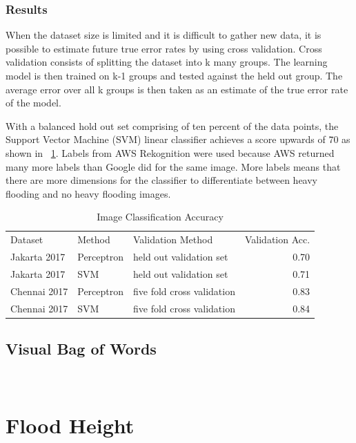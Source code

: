 \subsubsection{Results}
When the dataset size is limited and it is difficult to gather new data, 
it is possible to estimate future true error rates by using
cross validation. Cross validation consists of splitting the dataset into
k many groups. The learning model is then trained on k-1 groups and tested 
against the held out group. The average error over all k groups is then 
taken as an estimate of the true error rate of the model.

With a balanced hold out set comprising of ten percent of the
data points, the Support Vector Machine (SVM) linear classifier achieves a score
upwards of \.70 as shown in \tablename{}~\ref{chap4:imageSvmPerceptron}.
Labels from AWS Rekognition were used because AWS returned many more labels than 
Google did for the same image. More labels means that there are more dimensions
for the classifier to differentiate between heavy flooding and no heavy flooding
images.

\begin{table}[htbp]
\caption{Image Classification Accuracy}
\label{chap4:imageSvmPerceptron}
\begin{tabular}{lllr}
\toprule
      Dataset &      Method &           Validation Method &  Validation Acc. \\
 Jakarta 2017 &  Perceptron &     held out validation set &             0.70 \\
\midrule
 Jakarta 2017 &         SVM &     held out validation set &             0.71 \\
 Chennai 2017 &  Perceptron &  five fold cross validation &             0.83 \\
 Chennai 2017 &         SVM &  five fold cross validation &             0.84 \\
\bottomrule
\end{tabular}
\end{table}


\subsection{Visual Bag of Words}
~\cite{yangEvaluatingBagofvisualwordsRepresentations2007}

\section{Flood Height}
